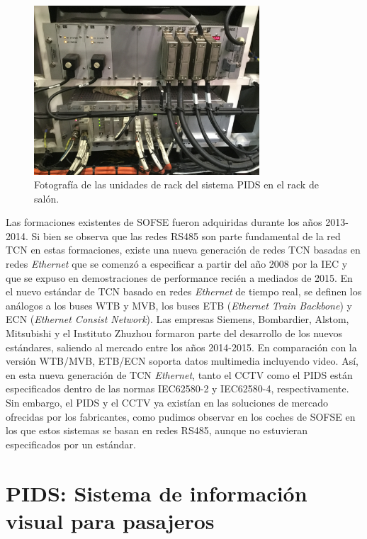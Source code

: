\begin{figure}[htbp]
	\centering
	\includegraphics[width=0.75\textwidth]{./Figures/rackPIDS1.JPG}
	\caption{Fotografía de las unidades de rack del sistema PIDS en el rack de salón.}
	\label{fig:rackPIDS1}
\end{figure}


Las formaciones existentes de SOFSE fueron adquiridas durante los años 2013-2014. Si bien se observa que las redes RS485 son parte fundamental de la red TCN en estas formaciones, existe una nueva generación de redes TCN basadas en redes \textit{Ethernet} que se comenzó a especificar a partir del año 2008 por la IEC y que se expuso en demostraciones de performance recién a mediados de 2015. En el nuevo estándar de TCN basado en redes \textit{Ethernet} de tiempo real, se definen los análogos a los buses WTB y MVB, los buses ETB (\textit{Ethernet Train Backbone}) y ECN (\textit{Ethernet Consist Network}). Las empresas Siemens, Bombardier, Alstom, Mitsubishi y el Instituto Zhuzhou formaron parte del desarrollo de los nuevos estándares, saliendo al mercado entre los años 2014-2015. En comparación con la versión WTB/MVB, ETB/ECN soporta datos multimedia incluyendo video. Así, en esta nueva generación de TCN \textit{Ethernet}, tanto el CCTV como el PIDS están especificados dentro de las normas IEC62580-2 y IEC62580-4, respectivamente. Sin embargo, el PIDS y el CCTV ya existían en las soluciones de mercado ofrecidas por los fabricantes, como pudimos observar en los coches de SOFSE en los que estos sistemas se basan en redes RS485, aunque no estuvieran especificados por un estándar.\\



\pagebreak
\newpage

\section{PIDS: Sistema de información visual para pasajeros}

